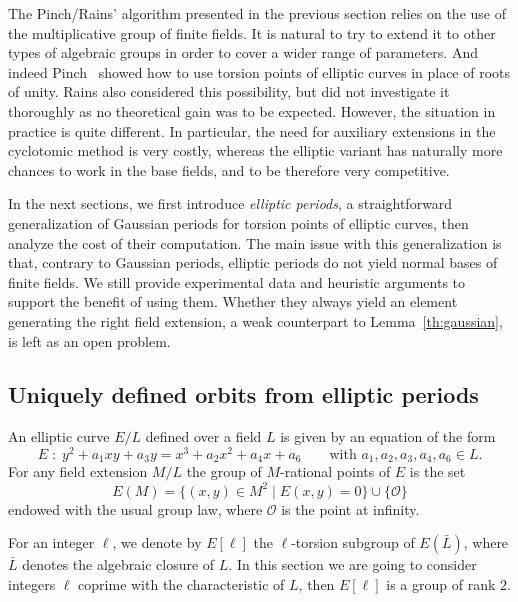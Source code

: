 \documentclass{mcom-l}
\theoremstyle{plain}
\theoremstyle{definition}
\newcounter{algorithm}
\begin{document}
The Pinch/Rains' algorithm presented in the previous section relies on the use
of the multiplicative group of finite fields.
It is natural to try to extend it to other types of algebraic groups in
order to cover a wider range of parameters.
And indeed Pinch~\cite{Pinch} showed how to use torsion points of elliptic
curves in place of roots of unity.
Rains also considered this possibility, but did not investigate it thoroughly
as no theoretical gain was to be expected.
However, the situation in practice is quite different.
In particular, the need for auxiliary extensions in the cyclotomic method
is very costly, whereas the elliptic variant has naturally more chances
to work in the base fields, and to be therefore very competitive.

In the next sections, we first introduce \emph{elliptic periods}, a
straightforward generalization of Gaussian periods for torsion points
of elliptic curves,
then analyze the cost of their computation.
The main issue with this generalization is that, contrary to Gaussian periods,
elliptic periods do not yield normal bases of finite fields.
We still provide experimental data and heuristic arguments
to support the benefit of using them.
Whether they always yield an element generating the right field extension,
a weak counterpart to Lemma~\ref{th:gaussian}, is left as an open problem.

\subsection{Uniquely defined orbits from elliptic periods}
\label{sec:ellperiods}

An elliptic curve $E/L$ defined over a field $L$ is given by an
equation of the form
\begin{equation*}
  E\;:\; y^2 + a_1xy + a_3y = x^3 + a_2x^2 + a_4x + a_6
  \qquad\text{with $a_1,a_2,a_3,a_4,a_6\in L$.}
\end{equation*}
For any field extension $M/L$ the group of $M$-rational points of $E$
is the set
\begin{equation*}
  E(M) = \{(x,y)\in M^2 \mid E(x,y) = 0\} \cup \{\mathcal{O}\}
\end{equation*}
endowed with the usual group law, where $\mathcal{O}$ is the point at
infinity.

For an integer $\ell$, we denote by $E[\ell]$ the $\ell$-torsion
subgroup of $E(\bar{L})$, where $\bar{L}$ denotes the algebraic
closure of $L$. In this section we are going to consider integers
$\ell$ coprime with the characteristic of $L$, then $E[\ell]$ is a
group of rank $2$.
\end{document}
